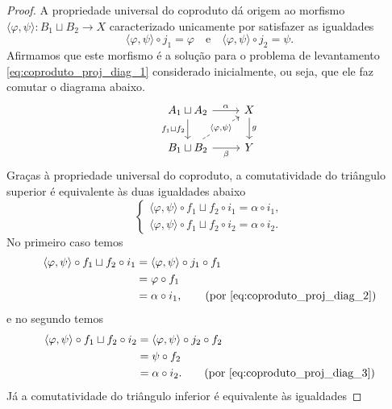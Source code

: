 \begin{proof}
  A propriedade universal do coproduto dá origem ao morfismo $\langle \varphi,\psi \rangle: B_1 \sqcup B_2 \to X$ caracterizado unicamente por satisfazer as igualdades
  \begin{displaymath}
    \langle \varphi,\psi \rangle \circ j_1 = \varphi \quad \text{e} \quad \langle \varphi,\psi \rangle \circ j_2 = \psi.
  \end{displaymath}
  Afirmamos que este morfismo é a solução para o problema de levantamento \eqref{eq:coproduto_proj_diag_1} considerado inicialmente, ou seja, que ele faz comutar o diagrama abaixo.
  \begin{displaymath}
    \begin{tikzcd}
      A_1 \sqcup A_2
      \arrow[r, "\alpha"]
      \arrow[d, "f_1 \sqcup f_2" swap]
      & X
      \arrow[d, "g"]
      \\ B_1 \sqcup B_2
      \arrow[r, "\beta" swap]
      \arrow[ru, dashed, "{\langle \varphi,\psi \rangle}" description]
      & Y
    \end{tikzcd}
  \end{displaymath}
  Graças à propriedade universal do coproduto, a comutatividade do triângulo superior é equivalente às duas igualdades abaixo
  \begin{displaymath}
    \begin{cases}
      \langle \varphi,\psi \rangle \circ f_1 \sqcup f_2 \circ i_1 = \alpha \circ i_1, \\
      \langle \varphi,\psi \rangle \circ f_1 \sqcup f_2 \circ i_2 = \alpha \circ i_2.
    \end{cases}
  \end{displaymath}
  No primeiro caso temos
  \begin{align*}
    \langle \varphi,\psi \rangle \circ f_1 \sqcup f_2 \circ i_1
    & = \langle \varphi,\psi \rangle \circ j_1 \circ f_1 \\
    & = \varphi \circ f_1 \\
    & = \alpha \circ i_1,
    \tag{por \eqref{eq:coproduto_proj_diag_2}}
  \end{align*}
  e no segundo temos
  \begin{align*}
    \langle \varphi,\psi \rangle \circ f_1 \sqcup f_2 \circ i_2
    & = \langle \varphi,\psi \rangle \circ j_2 \circ f_2 \\
    & = \psi \circ f_2 \\
    & = \alpha \circ i_2.
    \tag{por \eqref{eq:coproduto_proj_diag_3}}
  \end{align*}
  Já a comutatividade do triângulo inferior é equivalente às igualdades

\end{proof}
